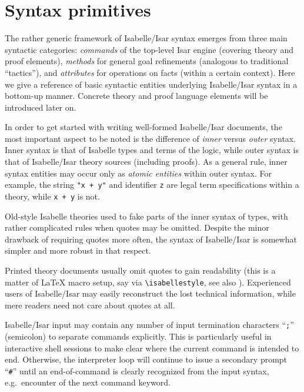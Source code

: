 
\chapter{Syntax primitives}

The rather generic framework of Isabelle/Isar syntax emerges from three main
syntactic categories: \emph{commands} of the top-level Isar engine (covering
theory and proof elements), \emph{methods} for general goal refinements
(analogous to traditional ``tactics''), and \emph{attributes} for operations
on facts (within a certain context).  Here we give a reference of basic
syntactic entities underlying Isabelle/Isar syntax in a bottom-up manner.
Concrete theory and proof language elements will be introduced later on.

\medskip

In order to get started with writing well-formed Isabelle/Isar documents, the
most important aspect to be noted is the difference of \emph{inner} versus
\emph{outer} syntax.  Inner syntax is that of Isabelle types and terms of the
logic, while outer syntax is that of Isabelle/Isar theory sources (including
proofs).  As a general rule, inner syntax entities may occur only as
\emph{atomic entities} within outer syntax.  For example, the string
\texttt{"x + y"} and identifier \texttt{z} are legal term specifications
within a theory, while \texttt{x + y} is not.

\begin{warn}
  Old-style Isabelle theories used to fake parts of the inner syntax of types,
  with rather complicated rules when quotes may be omitted.  Despite the minor
  drawback of requiring quotes more often, the syntax of Isabelle/Isar is
  somewhat simpler and more robust in that respect.
\end{warn}

Printed theory documents usually omit quotes to gain readability (this is a
matter of {\LaTeX} macro setup, say via \verb,\isabellestyle,, see also
\cite{isabelle-sys}).  Experienced users of Isabelle/Isar may easily
reconstruct the lost technical information, while mere readers need not care
about quotes at all.

\medskip

Isabelle/Isar input may contain any number of input termination characters
``\texttt{;}'' (semicolon) to separate commands explicitly.  This is
particularly useful in interactive shell sessions to make clear where the
current command is intended to end.  Otherwise, the interpreter loop will
continue to issue a secondary prompt ``\verb,#,'' until an end-of-command is
clearly recognized from the input syntax, e.g.\ encounter of the next command
keyword.

